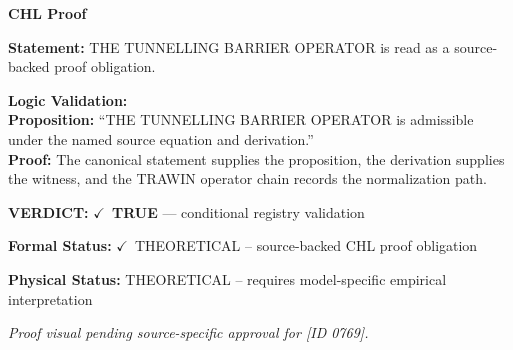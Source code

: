 \vspace{0.45em}
\noindent\textbf{CHL Proof}\par
\textbf{Statement:} THE TUNNELLING BARRIER OPERATOR is read as a source-backed proof obligation.

\textbf{Logic Validation:}\\
\textbf{Proposition:} ``THE TUNNELLING BARRIER OPERATOR is admissible under the named source equation and derivation.''\\
\textbf{Proof:} The canonical statement supplies the proposition, the derivation supplies the witness, and the TRAWIN operator chain records the normalization path.

\textbf{VERDICT:} \ensuremath{\checkmark}\ \textbf{TRUE} --- conditional registry validation

\textbf{Formal Status:} \ensuremath{\checkmark}\ THEORETICAL -- source-backed CHL proof obligation

\textbf{Physical Status:} THEORETICAL -- requires model-specific empirical interpretation
\par\vspace{0.45em}
\par
\vfill
\begingroup\footnotesize\itshape
Proof visual pending source-specific approval for [ID 0769].
\par\endgroup
\vfill
\endgroup
\endgroup
